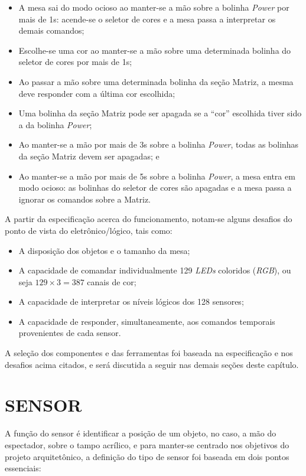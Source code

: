 \begin{itemize}[noitemsep]
    \item A mesa sai do modo ocioso ao manter-se a mão sobre a bolinha \emph{Power} por mais de 1s: acende-se o seletor de cores e a mesa passa a interpretar os demais comandos;
    \item Escolhe-se uma cor ao manter-se a mão sobre uma determinada bolinha do seletor de cores por mais de 1s;
    \item Ao passar a mão sobre uma determinada bolinha da seção Matriz, a mesma deve responder com a última cor escolhida;
    \item Uma bolinha da seção Matriz pode ser apagada se a ``cor'' escolhida tiver sido a da bolinha \emph{Power};
    \item Ao manter-se a mão por mais de 3s sobre a bolinha \emph{Power}, todas as bolinhas da seção Matriz devem ser apagadas; e
    \item Ao manter-se a mão por mais de 5s sobre a bolinha \emph{Power}, a mesa entra em modo ocioso: as bolinhas do seletor de cores são apagadas e a mesa passa a ignorar os comandos sobre a Matriz.
\end{itemize}

A partir da especificação acerca do funcionamento, notam-se alguns desafios do ponto de vista do eletrônico/lógico, tais como:

\begin{itemize}
    \item A disposição dos objetos e o tamanho da mesa;
    \item A capacidade de comandar individualmente 129 \emph{LEDs} coloridos (\emph{RGB}), ou seja $129 \times 3 = 387$ canais de cor;
    \item A capacidade de interpretar os níveis lógicos dos 128 sensores;
    \item A capacidade de responder, simultaneamente, aos comandos temporais provenientes de cada sensor.
\end{itemize}

A seleção dos componentes e das ferramentas foi baseada na especificação e nos desafios acima citados, e será discutida a seguir nas demais seções deste capítulo.

\section{SENSOR}
\label{sec:sensor}

A função do sensor é identificar a posição de um objeto, no caso, a mão do espectador, sobre o tampo acrílico, e para manter-se centrado nos objetivos do projeto arquitetônico, a definição do tipo de sensor foi baseada em dois pontos essenciais:

